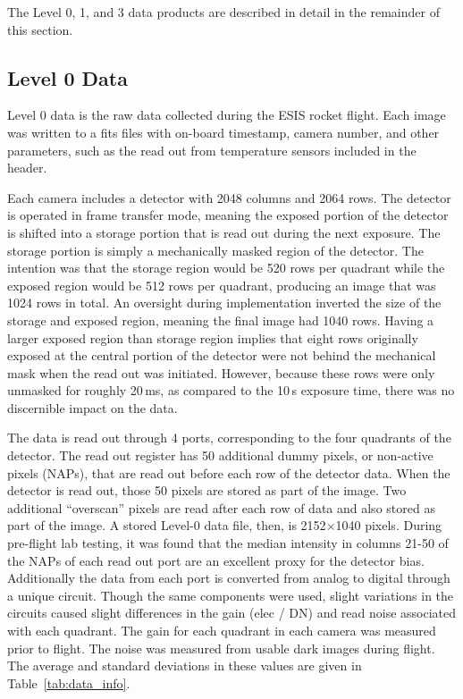 The Level 0, 1, and 3 data products are described in detail in the remainder of this section. 

    
\subsection{Level 0 Data}
    
Level 0 data is the raw data collected during the ESIS rocket flight.  
Each image was written to a fits files with on-board timestamp, camera number, and other parameters, such as the read out from temperature sensors included in the header.   

Each camera includes a detector with 2048 columns and 2064 rows.  The detector is operated in frame transfer mode, meaning the exposed portion of the detector is shifted into a storage portion that is read out during the next exposure. The storage portion is simply a mechanically masked region of the detector. The intention was that the storage region would be 520 rows per quadrant while the exposed region would be 512 rows per quadrant, producing an image that was 1024 rows in total.  An oversight during implementation inverted the size of the storage and exposed region, meaning the final image had 1040 rows.  Having a larger exposed region than storage region implies that eight rows originally exposed at the central portion of the detector were not behind the mechanical mask when the read out was initiated. However, because these rows were only unmasked for roughly 20\,ms, as compared to the 10\,s exposure time, there was no discernible impact on the data. 


The data is read out through 4 ports, corresponding to the four quadrants of the detector.  The read out register has 50 additional dummy pixels, or non-active pixels (NAPs), that are read out before each row of the detector data.  When the detector is read out, those 50 pixels are stored as part of the image.  Two additional ``overscan'' pixels are read after each row of data and also stored as part of the image.  A stored Level-0 data file, then, is 2152$\times$1040 pixels.   During pre-flight lab testing, it was found that the median intensity in columns 21-50 of the NAPs of each read out port are an excellent proxy for the detector bias.  Additionally the data from each port is converted from analog to digital through a unique circuit.  Though the same components were used, slight variations in the circuits caused slight differences in the gain (elec / DN) and read  noise associated with each quadrant.  The gain for each quadrant in each camera was measured prior to flight.  The noise was measured from usable dark images during flight.  The average and standard deviations in these values are given in Table~\ref{tab:data_info}.
    
